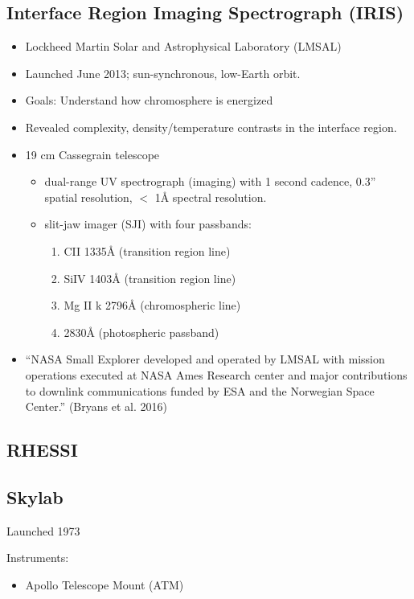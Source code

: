 \documentclass{article}
\begin{document}
\subsection{Interface Region Imaging Spectrograph (IRIS)}
\begin{itemize}
    \item Lockheed Martin Solar and Astrophysical Laboratory (LMSAL)
    \item Launched June 2013; sun-synchronous, low-Earth orbit.
    \item Goals: Understand how chromosphere is energized
    \item Revealed complexity, density/temperature contrasts in the interface
        region.
    \item 19 cm Cassegrain telescope
        \begin{itemize}
            \item dual-range UV spectrograph (imaging) with 1 second cadence,
                0.3'' spatial resolution, $<$ 1\AA{} spectral resolution.
            \item slit-jaw imager (SJI) with four passbands:
                \begin{enumerate}
                    \item CII 1335\AA{} (transition region line)
                    \item SiIV 1403\AA{} (transition region line)
                    \item Mg II k 2796\AA{} (chromospheric line)
                    \item 2830\AA{} (photospheric passband)
                \end{enumerate}
        \end{itemize}
    \item ``NASA Small Explorer developed and operated by LMSAL with mission operations
    executed at NASA Ames Research center and major contributions to downlink
    communications funded by ESA and the Norwegian Space Center.''
    (Bryans et al. 2016)
\end{itemize}
\subsection{RHESSI}

\subsection{Skylab}
Launched 1973

Instruments:
\begin{itemize}
    \item Apollo Telescope Mount (ATM)
\end{itemize}
\end{document}
